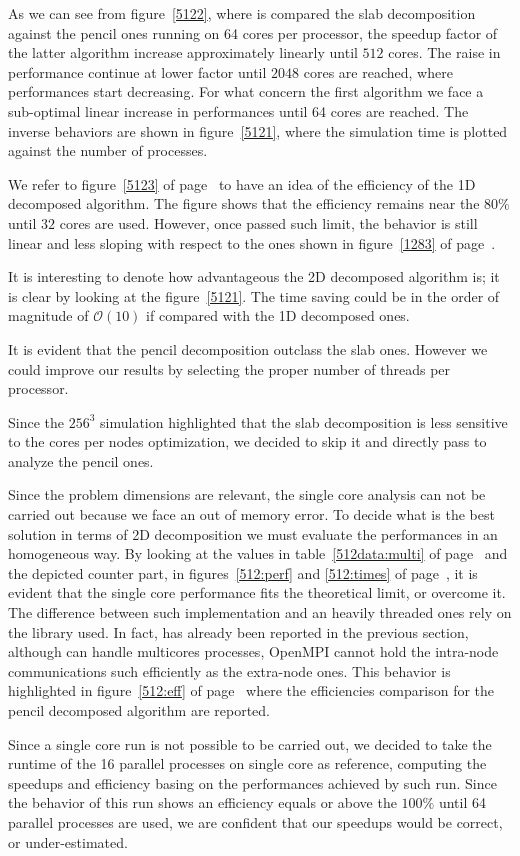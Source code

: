 As we can see from figure~\ref{5122}, where is compared the slab decomposition against the pencil ones running on 64 cores per processor, the speedup factor of the latter algorithm increase approximately linearly until $512$ cores. The raise in performance continue at lower factor until $2048$ cores are reached, where performances start decreasing. For what concern the first algorithm we face a sub-optimal linear increase in performances until 64 cores are reached. 
The inverse behaviors are shown in figure~\ref{5121}, where the simulation time is plotted against the number of processes.
\par
We refer to figure~\ref{5123} of page~\pageref{5123} to have an idea of the efficiency of the 1D decomposed algorithm. The figure shows that the efficiency remains near the $80\%$ until $32$ cores are used. However, once passed such limit, the behavior is still linear and less sloping with  respect to the ones shown in figure~\ref{1283} of page~\pageref{1283}.  \\
\par
It is interesting to denote how advantageous the 2D decomposed algorithm is; it is clear by looking at the figure~\ref{5121}. The time saving could be in the order of magnitude of $\mathcal{O}(10)$ if compared with the 1D decomposed ones.\\
\par
It is evident that the pencil decomposition outclass the slab ones. However we could improve our results by selecting the proper number of threads per processor. 
\par
Since the $256^{3}$ simulation highlighted that the slab decomposition is less sensitive to the cores per nodes optimization, we decided to skip it and directly pass to analyze the pencil ones. \par
Since the problem dimensions are relevant, the single core analysis can not be carried out because we face an out of memory error.
To decide what is the best solution in terms of 2D decomposition we must evaluate the performances in an homogeneous way. 
By looking at the values in table~\ref{512data:multi} of page~\pageref{512data:multi} and the depicted counter part, in figures~\ref{512:perf} and \ref{512:times} of page~\pageref{512:perf}, it is evident that the single core performance fits the theoretical limit, or overcome it. The difference between such implementation and an heavily threaded ones rely on the library used. In fact, has already been reported in the previous section, although can handle multicores processes, OpenMPI cannot hold the intra-node communications such efficiently as the extra-node ones. This behavior is highlighted in figure~\ref{512:eff} of page~\pageref{512:eff} where the efficiencies comparison for the pencil decomposed algorithm are reported.
\par
Since a single core run is not possible to be carried out, we decided to take the runtime of the 16 parallel processes on single core as reference, computing the speedups and efficiency basing on the performances achieved by such run. Since the behavior of this run shows an efficiency equals or above the $100\%$ until 64 parallel processes are used, we are confident that our speedups would be correct, or under-estimated.

